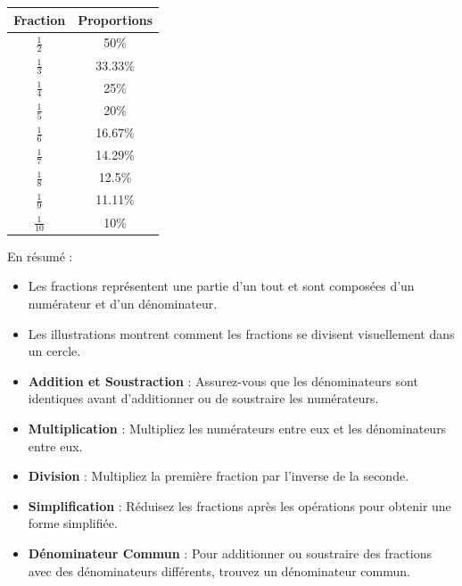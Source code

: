 \documentclass{article}
\begin{document}
\vspace{0.2cm}
\begin{tcolorbox}[colback=orange!10!white, colframe=orange!75!black, title=\textcolor{white}{Comparaison des Fractions}, sharp corners=south, boxrule=0.8mm]
    \centering
    \begin{tabular}{|c|c|}
        \hline
        \textbf{Fraction} & \textbf{Proportions} \\
        \hline
        \(\frac{1}{2}\) & 50\% \\
        \hline
        \(\frac{1}{3}\) & 33.33\% \\
        \hline
        \(\frac{1}{4}\) & 25\% \\
        \hline
        \(\frac{1}{5}\) & 20\% \\
        \hline
        \(\frac{1}{6}\) & 16.67\% \\
        \hline
        \(\frac{1}{7}\) & 14.29\% \\
        \hline
        \(\frac{1}{8}\) & 12.5\% \\
        \hline
        \(\frac{1}{9}\) & 11.11\% \\
        \hline
        \(\frac{1}{10}\) & 10\% \\
        \hline
    \end{tabular}
\end{tcolorbox}


\vspace{0.2cm}
\begin{tcolorbox}[colback=blue!10!white, colframe=cyan!75!black, title=\textcolor{white}{Récapitulatif}, sharp corners=south, boxrule=0.8mm]
    En résumé :
    \begin{itemize}
        \item Les fractions représentent une partie d'un tout et sont composées d'un numérateur et d'un dénominateur.
        \item Les illustrations montrent comment les fractions se divisent visuellement dans un cercle.
        \item \textbf{Addition et Soustraction} : Assurez-vous que les dénominateurs sont identiques avant d'additionner ou de soustraire les numérateurs.
        \item \textbf{Multiplication} : Multipliez les numérateurs entre eux et les dénominateurs entre eux.
        \item \textbf{Division} : Multipliez la première fraction par l'inverse de la seconde.
        \item \textbf{Simplification} : Réduisez les fractions après les opérations pour obtenir une forme simplifiée.
        \item \textbf{Dénominateur Commun} : Pour additionner ou soustraire des fractions avec des dénominateurs différents, trouvez un dénominateur commun.     
    \end{itemize}
\end{tcolorbox}
\end{document}
